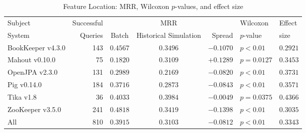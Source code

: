 \begin{table}[t]
\centering
\caption{Feature Location: MRR, Wilcoxon $p$-values, and effect size}
\begin{tabular}{l|r|ccr|ll}
\toprule
Subject & Successful &    & MRR &        & Wilcoxon  & Effect \\
System  & Queries    & Batch & Historical Simulation  & Spread & $p$-value & size \\
\midrule
BookKeeper v4.3.0 & 143 & $\bm{0.4567}$ & $0.3496$ & $-0.1070$ & $p < 0.01$ & $0.2921$ \\
Mahout v0.10.0 & 75 & $0.1820$ & $\bm{0.3109}$ & $+0.1289$ & $p = 0.0127$ & $0.3453$ \\
OpenJPA v2.3.0 & 131 & $\bm{0.2989}$ & $0.2169$ & $-0.0820$ & $p < 0.01$ & $0.3731$ \\
Pig v0.14.0 & 184 & $\bm{0.3716}$ & $0.2873$ & $-0.0843$ & $p < 0.01$ & $0.3571$ \\
Tika v1.8 & 36 & $\bm{0.4033}$ & $0.3984$ & $-0.0049$ & $p = 0.0375$ & $0.4366$ \\
ZooKeeper v3.5.0 & 241 & $\bm{0.4818}$ & $0.3419$ & $-0.1398$ & $p < 0.01$ & $0.3035$ \\
\midrule
All & 810 & $\bm{0.3915}$ & $0.3103$ & $-0.0812$ & $p < 0.01$ & $0.3343$ \\
\bottomrule
\end{tabular}
\label{table:feature_location_rq2}
\end{table}
